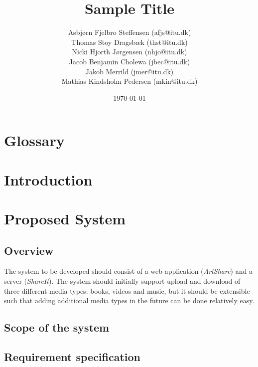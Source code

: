 \documentclass{report}
\title{Sample Title}
\date{\today}
\author{Asbj\o rn Fjelbro Steffensen (afjs@itu.dk)\\ Thomas Stoy Dragsb\ae k (thst@itu.dk)\\ Nicki Hjorth J\o rgensen (nhjo@itu.dk)\\ Jacob Benjamin Cholewa (jbec@itu.dk)\\ Jakob Merrild (jmer@itu.dk)\\ Mathias Kindsholm Pedersen (mkin@itu.dk)}
\begin{document}

\listoftodos[TODO]

\newpage
\tableofcontents

\chapter{Glossary}


\chapter{Introduction}


\newpage


\chapter{Proposed System}

\section{Overview}
The system to be developed should consist of a web application (\textit{ArtShare}) and a server (\textit{ShareIt}). The system should initially support upload and download of three different media types: books, videos and music, but it should be extensible such that adding additional media types in the future can be done relatively easy.


\section{Scope of the system}


\section{Requirement specification}
\end{document}
